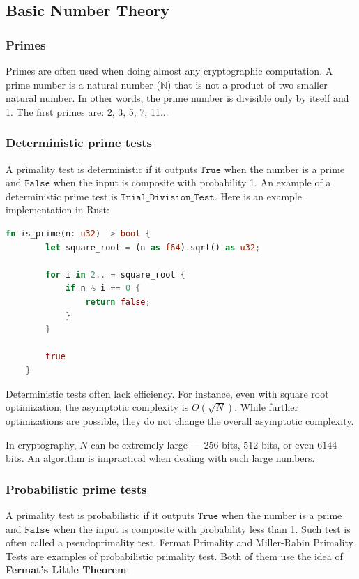 \documentclass[../lecture-notes.tex]{subfiles}
\begin{document}
\subsection{Basic Number Theory}

\subsubsection{Primes}

Primes are often used when doing almost any cryptographic computation. A prime number is a natural number ($\mathbb{N}$) that is not a product
of two smaller natural number. In other words, the prime number is divisible only by itself and 1. The first primes are: 2, 3, 5, 7, 11...

\subsubsection{Deterministic prime tests}

A primality test is deterministic if it outputs $\mathtt{True}$ when the number is a prime and $\mathtt{False}$ when the input is composite with probability 1.
An example of a deterministic prime test is $\mathtt{Trial\_Division\_Test}$. Here is an example implementation in Rust: 

\begin{lstlisting}[language=Rust]
    fn is_prime(n: u32) -> bool {
        let square_root = (n as f64).sqrt() as u32;

        for i in 2.. = square_root {
            if n % i == 0 {
                return false;
            }
        }

        true
    }
\end{lstlisting}

Deterministic tests often lack efficiency. For instance, even with square root optimization, the asymptotic complexity is $O(\sqrt{N})$. 
While further optimizations are possible, they do not change the overall asymptotic complexity.

In cryptography, $N$ can be extremely large — $256$ bits, $512$ bits, or even $6144$ bits. 
An algorithm is impractical when dealing with such large numbers.

\subsubsection{Probabilistic prime tests}

A primality test is probabilistic if it outputs $\mathtt{True}$ when the number is a prime and $\mathtt{False}$ when the input is composite with probability less than 1. Such test is often called a pseudoprimality test.
Fermat Primality and Miller-Rabin Primality Tests are examples of probabilistic primality test. Both of them use the idea of \textbf{Fermat's Little Theorem}:
\end{document}
